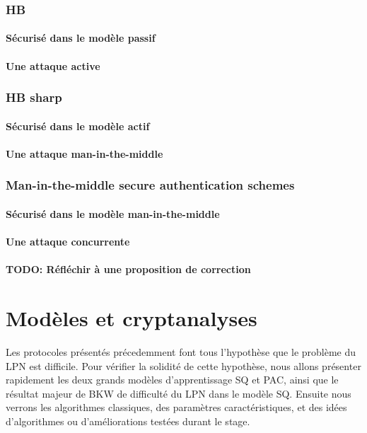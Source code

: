 \documentclass{article}		%
\theoremstyle{definition}
\theoremstyle{plain}
\begin{document}
\subsubsection{HB}
\paragraph{Sécurisé dans le modèle passif}
\paragraph{Une attaque active}
\subsubsection{HB sharp}
\paragraph{Sécurisé dans le modèle actif}
\paragraph{Une attaque man-in-the-middle}
\subsubsection{Man-in-the-middle secure authentication schemes}
\paragraph{Sécurisé dans le modèle man-in-the-middle}
\paragraph{Une attaque concurrente}
\paragraph{TODO: Réfléchir à une proposition de correction}

\section{Modèles et cryptanalyses}
Les protocoles présentés précedemment font tous l'hypothèse que le
problème du LPN est difficile. Pour vérifier la solidité de cette
hypothèse,   nous allons
présenter rapidement les deux grands modèles d'apprentissage SQ et PAC, ainsi que le
résultat majeur de BKW de difficulté du LPN dans le modèle SQ. Ensuite
nous verrons les algorithmes classiques, des paramètres caractéristiques,
et des idées d'algorithmes ou d'améliorations testées durant le stage.
\end{document}
